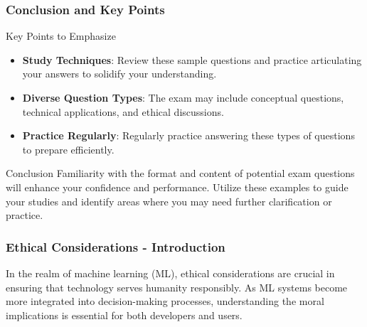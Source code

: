 \documentclass[aspectratio=169]{beamer}
\begin{document}
\begin{frame}[fragile]
    \frametitle{Conclusion and Key Points}
    \begin{block}{Key Points to Emphasize}
        \begin{itemize}
            \item \textbf{Study Techniques}: Review these sample questions and practice articulating your answers to solidify your understanding.
            \item \textbf{Diverse Question Types}: The exam may include conceptual questions, technical applications, and ethical discussions.
            \item \textbf{Practice Regularly}: Regularly practice answering these types of questions to prepare efficiently.
        \end{itemize}
    \end{block}

    \begin{block}{Conclusion}
        Familiarity with the format and content of potential exam questions will enhance your confidence and performance. 
        Utilize these examples to guide your studies and identify areas where you may need further clarification or practice.
    \end{block}
\end{frame}

\begin{frame}[fragile]
    \frametitle{Ethical Considerations - Introduction}
    In the realm of machine learning (ML), ethical considerations are crucial in ensuring that technology serves humanity responsibly. 
    As ML systems become more integrated into decision-making processes, understanding the moral implications is essential for both developers and users.
\end{frame}
\end{document}
